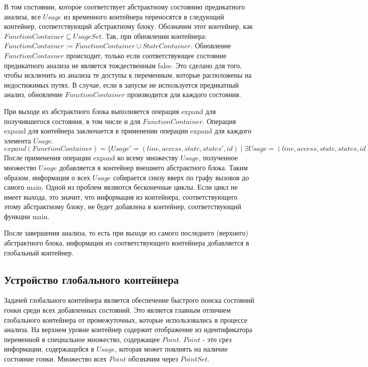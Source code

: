 В том состоянии, которое соответствует абстрактному состоянию предикатного анализа, все $Usage$ из временного контейнера переносятся в следующий контейнер, соответствующий абстрактному блоку. Обозначим этот контейнер, как $FunctionContainer \subseteq UsageSet$.
Так, при обновлении контейнера: $FunctionContainer := FunctionContainer \cup StateContainer$.
Обновление $FunctionContainer$ происходит, только если соответствующее состояние предикатного анализа не является тождественным false.
Это сделано для того, чтобы исключить из анализа те доступы к переменным, которые расположены на недостижимых путях.
В случае, если в запуске не используется предикатный анализ, обновление $FunctionContainer$ производится для каждого состояния.

При выходе из абстрактного блока выполняется операция expand для получившегося состояния, в том числе и для $FunctionContainer$.
Операция expand для контейнера заключается в применении операции expand для каждого элемента $Usage$.
$expand(FunctionContainer) = \{Usage'=(line, access, state, states', id) \mid \exists Usage=(line, access, state, states, id) \in FunctionContainer \land states'=\{s' \mid s' = expand(s) \land s \in states\} \}$
После применения операции expand ко всему множеству $Usage$, полученное множество $Usage$ добавляется в контейнер внешнего абстрактного блока.
Таким образом, информация о всех $Usage$ собирается снизу вверх по графу вызовов до самого main. 
Одной из проблем являются бесконечные циклы. Если цикл не имеет выхода, это значит, что информация из контейнера, соответствующего этому абстрактному блоку, не будет добавлена в контейнер, соответствующий функции main.

После завершения анализа, то есть при выходе из самого последнего (верхнего) абстрактного блока, информация из соответствующего контейнера добавляется в глобальный контейнер.

\subsection{Устройство глобального контейнера} \label{subsect_impl_global_storage}

Задачей глобального контейнера является обеспечение быстрого поиска состояний гонки среди всех добавленных состояний. 
Это является главным отличием глобального контейнера от промежуточных, которые использовались в процессе анализа. 
На верхнем уровне контейнер содержит отображение из идентификатора переменной в специальное множество, содержащее $Point$.
$Point$ - это срез информации, содержащейся в $Usage$, которая может повлиять на наличие состояние гонки.
Множество всех $Point$ обозначим через $PointSet$.

